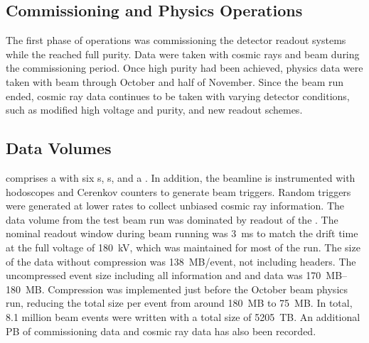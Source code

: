 \subsection{Commissioning and Physics Operations}

The first phase of operations was commissioning the detector readout systems while the  reached full purity.  Data were taken with cosmic rays and beam during the commissioning period. Once high  purity had been achieved, physics data were  taken with beam through October and half of November. %
Since the beam run ended, cosmic ray data continues to be taken with varying detector conditions, such as modified high voltage and purity, and new readout schemes. 


\subsection{Data Volumes}
 comprises a  with  six s, s, and a . In addition, the  beamline is instrumented with hodoscopes and Cerenkov counters to generate beam triggers. Random triggers  were generated at lower rates to collect unbiased cosmic ray information. The data volume from the test beam run was dominated by readout of the . %
The nominal readout window during beam running was  \SI{3}{ms} to match the drift time at the full voltage of \SI{180}{kV}, which was maintained for most of the run.  The size of the  data without compression was  \SI{138}{MB/event}, not including headers.  The uncompressed event size including all  information and  and  data was \SIrange{170}{180}{MB}. Compression was implemented just before the October beam physics run, reducing the total size per event from around \SI{180}{MB} to \SI{75}{MB}.  In total, 8.1 million beam events were written with a total size of \SI{5205}{TB}.  An additional PB of commissioning data and cosmic ray data has also been recorded. 

